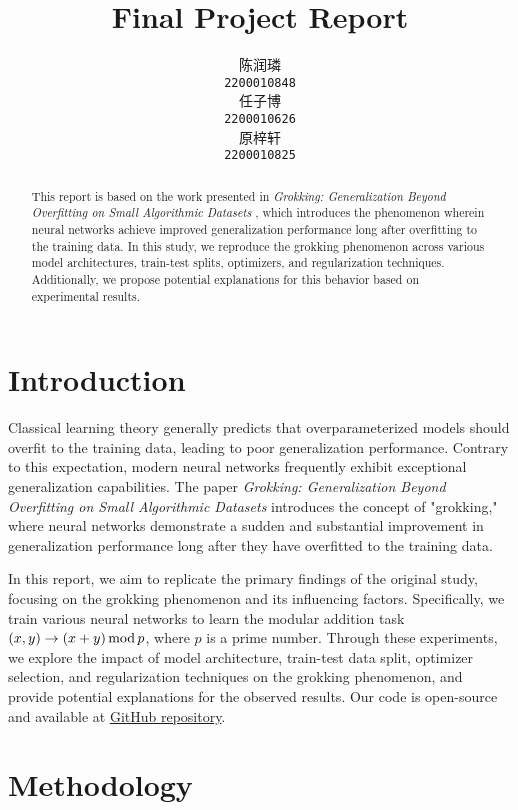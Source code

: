 \documentclass{article}
\title{Final Project Report}
\author{
    陈润璘 \\
    \texttt{2200010848} \\
    \And
    任子博 \\
    \texttt{2200010626} \\
    \And
    原梓轩 \\
    \texttt{2200010825} \\
}
\begin{document}
\maketitle

\begin{abstract}
    This report is based on the work presented in \textit{Grokking: Generalization Beyond Overfitting on Small Algorithmic Datasets} \cite{power2022grokking}, which introduces the phenomenon wherein neural networks achieve improved generalization performance long after overfitting to the training data. In this study, we reproduce the grokking phenomenon across various model architectures, train-test splits, optimizers, and regularization techniques. Additionally, we propose potential explanations for this behavior based on experimental results.
\end{abstract}

\section{Introduction}

Classical learning theory generally predicts that overparameterized models should overfit to the training data, leading to poor generalization performance. Contrary to this expectation, modern neural networks frequently exhibit exceptional generalization capabilities. The paper \textit{Grokking: Generalization Beyond Overfitting on Small Algorithmic Datasets} introduces the concept of "grokking," where neural networks demonstrate a sudden and substantial improvement in generalization performance long after they have overfitted to the training data.

In this report, we aim to replicate the primary findings of the original study, focusing on the grokking phenomenon and its influencing factors. Specifically, we train various neural networks to learn the modular addition task $(x, y) \rightarrow (x + y)\, {\rm mod}\, p$, where $p$ is a prime number. Through these experiments, we explore the impact of model architecture, train-test data split, optimizer selection, and regularization techniques on the grokking phenomenon, and provide potential explanations for the observed results. Our code is open-source and available at \href{https://github.com/LeoDreamer2004/Modular-Addition}{GitHub repository}.

\section{Methodology}
\end{document}
